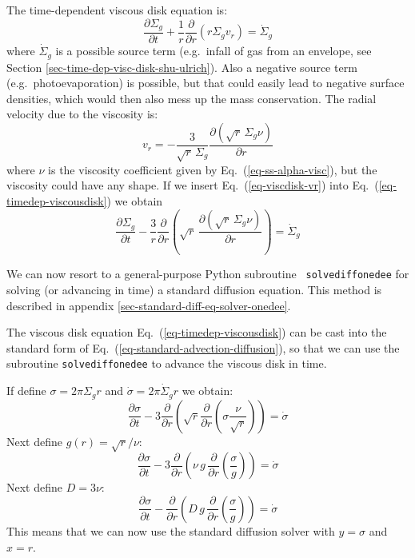 \documentclass{book}
\newcommand{\code}[1]{{\small\tt #1}}
\begin{document}
The time-dependent viscous disk equation is:
\begin{equation}\label{eq-timedep-viscousdisk}
  \frac{\partial\Sigma_g}{\partial t} + \frac{1}{r}\frac{\partial}{\partial r}
  \left(r\Sigma_g v_r\right) = \dot\Sigma_g
\end{equation}
where $\dot\Sigma_g$ is a possible source term (e.g.\ infall of gas from an
envelope, see Section \ref{sec-time-dep-visc-disk-shu-ulrich}).
Also a negative source term (e.g.\ photoevaporation) is possible,
but that could easily lead to negative surface densities, which would then
also mess up the mass conservation.
The radial velocity due to the viscosity is:
\begin{equation}\label{eq-viscdisk-vr}
v_r = -\frac{3}{\sqrt{r}\,\Sigma_g}\frac{\partial (\sqrt{r}\,\Sigma_g\nu)}{\partial r}
\end{equation}
where $\nu$ is the viscosity coefficient given by Eq.~(\ref{eq-ss-alpha-visc}),
but the viscosity could have any shape. If we insert Eq.~(\ref{eq-viscdisk-vr}) into
Eq.~(\ref{eq-timedep-viscousdisk}) we obtain
\begin{equation}
  \frac{\partial\Sigma_g}{\partial t} - \frac{3}{r}\frac{\partial}{\partial r}
  \left(\sqrt{r}\,\frac{\partial (\sqrt{r}\,\Sigma_g\nu)}{\partial r}\right) = \dot\Sigma_g
\end{equation}

We can now resort to a general-purpose Python subroutine {\small\tt
  solvediffonedee} for solving (or advancing in time) a standard diffusion
equation. This method is described in appendix
\ref{sec-standard-diff-eq-solver-onedee}.

The viscous disk equation Eq.~(\ref{eq-timedep-viscousdisk}) can be cast into
the standard form of Eq.~(\ref{eq-standard-advection-diffusion}), so that we can
use the subroutine \code{solvediffonedee} to advance the viscous
disk in time.

If define $\sigma = 2\pi \Sigma_g r$ and $\dot\sigma = 2\pi \dot\Sigma_g r$ we obtain:
\begin{equation}
  \frac{\partial \sigma}{\partial t} -3\frac{\partial}{\partial r}
  \left(\sqrt{r}\frac{\partial}{\partial r}\left(\sigma\frac{\nu}{\sqrt{r}}\right)\right)=\dot \sigma
\end{equation}
Next define $g(r)=\sqrt{r}/\nu$:
\begin{equation}
  \frac{\partial \sigma}{\partial t} -3\frac{\partial}{\partial r}
  \left(\nu\, g\,\frac{\partial}{\partial r}\left(\frac{\sigma}{g}\right)\right)=\dot\sigma
\end{equation}
Next define $D=3\nu$:
\begin{equation}
  \frac{\partial \sigma}{\partial t} -\frac{\partial}{\partial r}
  \left(D\, g\,\frac{\partial}{\partial r}\left(\frac{\sigma}{g}\right)\right)=\dot\sigma
\end{equation}
This means that we can now use the standard diffusion solver with $y=\sigma$ and $x=r$.
\end{document}
